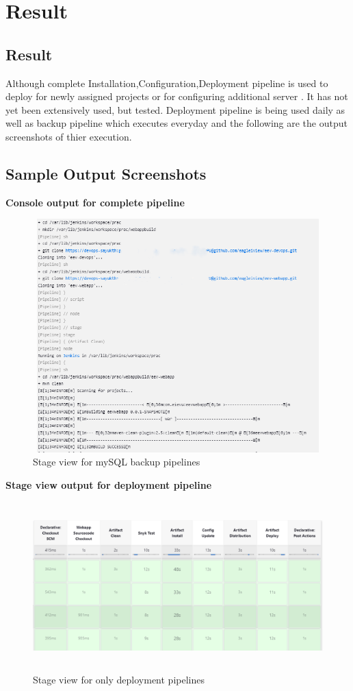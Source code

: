 \documentclass[12pt,a4paper,oneside]{report}
\begin{document}
\newpage
\chapter{Result}
\section{Result}
\par Although complete Installation,Configuration,Deployment pipeline is used to deploy for newly assigned projects or for configuring additional server . It has not yet been extensively used, but tested. Deployment pipeline is being used daily as well as backup pipeline which executes everyday and the following are the output screenshots of thier execution.

\section{Sample Output Screenshots}
\textbf{{\large Console output for complete pipeline}}
\begin{figure}[H]
    \centering
    \includegraphics[width=145mm , height = 90mm]{all-deployment-console.png}
    \caption{Stage view for mySQL backup pipelines}
    \label{fig:figure5_1}
\end{figure}
\textbf{{\large Stage view output for deployment pipeline}}
\begin{figure}[H]
    \centering
    \includegraphics[width=150mm , height = 65mm]{deployment-stages.png}
    \caption{Stage view for only deployment pipelines}
    \label{fig:figure5_1}
\end{figure}
\end{document}
